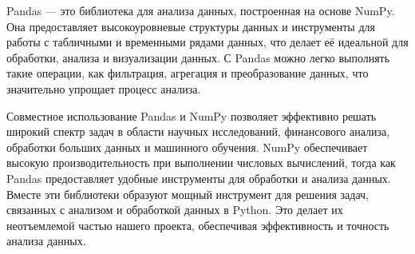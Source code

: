 Pandas --- это библиотека для анализа данных, построенная на основе NumPy. Она предоставляет высокоуровневые структуры данных и инструменты для работы с табличными и временными рядами данных, что делает её идеальной для обработки, анализа и визуализации данных. С Pandas можно легко выполнять такие операции, как фильтрация, агрегация и преобразование данных, что значительно упрощает процесс анализа.

Совместное использование Pandas и NumPy позволяет эффективно решать широкий спектр задач в области научных исследований, финансового анализа, обработки больших данных и машинного обучения. NumPy обеспечивает высокую производительность при выполнении числовых вычислений, тогда как Pandas предоставляет удобные инструменты для обработки и анализа данных. Вместе эти библиотеки образуют мощный инструмент для решения задач, связанных с анализом и обработкой данных в Python. Это делает их неотъемлемой частью нашего проекта, обеспечивая эффективность и точность анализа данных.







